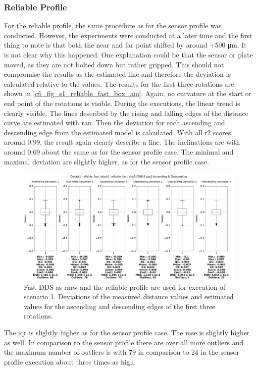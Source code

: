 \subsubsection{Reliable Profile}
For the reliable profile, the same procedure as for the sensor profile was conducted. However, the experiments were conducted at a later time and the first thing to note is that both the near and far point shifted by around +500 \si{\micro\meter}.
It is not clear why this happened. One explanation could be that the sensor or plate moved, as they are not bolted down but rather gripped. This should not compromise the results as the estimated line and therefore the deviation is calculated relative to the values.\newline 
The results for the first three rotations are shown in \autoref{c6_fig_s1_reliable_fast_box_aio}. Again, no curvature at the start or end point of the rotations is visible. During the executions, the linear trend is clearly visible. The lines described by the rising and falling edges of the distance curve are estimated with \gls{ran}. Then the deviation for each ascending and descending edge from the estimated model is calculated. With all \gls{r2} scores around 0.99, the result again clearly describe a line. The inclinations are with around 0.69 about the same as for the sensor profile case. The minimal and maximal deviation are slightly higher, as for the sensor profile case. 
\begin{figure}[htbp]
	\centering
	\includegraphics[width=1\textwidth]{Figures/c6/s1/s1_reliable_fast_dds_3_box_aio.pdf}
	\caption{Fast DDS as \gls{rmw} and the reliable profile are used for execution of scenario 1. Deviations of the measured distance values and estimated values for the ascending and descending edges of the first three rotations.}
	\label{c6_fig_s1_reliable_fast_box_aio}
\end{figure}
The \gls{iqr} is slightly higher as for the sensor profile case. The \gls{mse} is slightly higher as well. In comparison to the sensor profile there are over all more outliers and the maximum number of outliers is with 79 in comparison to 24 in the sensor profile execution about three times as high.\newline
